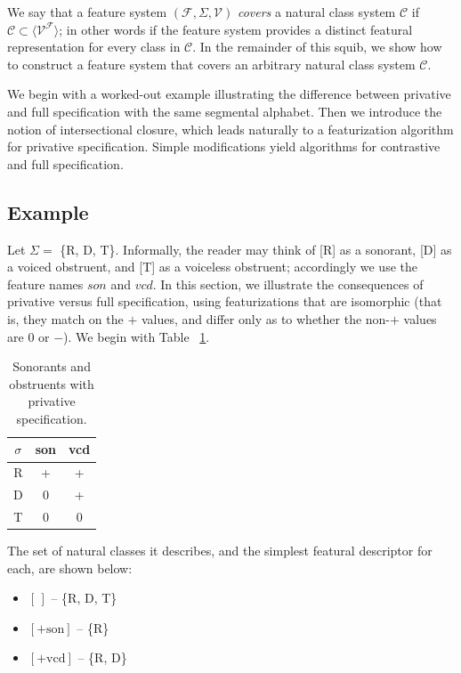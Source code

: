 \documentclass[11pt, oneside]{article}   	%
\begin{document}
\vspace{\baselineskip} We say that a feature system $(\mathcal F, \Sigma, \mathcal V)$ \textit{covers} a natural class system $\mathcal C$ if $\mathcal C \subset \langle \mathcal V^\mathcal F \rangle$; in other words if the feature system provides a distinct featural representation for every class in $\mathcal C$. In the remainder of this squib, we show how to construct a feature system that covers an arbitrary natural class system $\mathcal C$.

We begin with a worked-out example illustrating the difference between privative and full specification with the same segmental alphabet. Then we introduce the notion of intersectional closure, which leads naturally to a featurization algorithm for privative specification. Simple modifications yield algorithms for contrastive and full specification.

\subsection{Example}

Let $\Sigma =$ \{R, D, T\}. Informally, the reader may think of [R] as a sonorant, [D] as a voiced obstruent, and [T] as a voiceless obstruent; accordingly we use the feature names $son$ and $vcd$. In this section, we illustrate the consequences of privative versus full specification, using featurizations that are isomorphic (that is, they match on the $+$ values, and differ only as to whether the non-$+$ values are $0$ or $-$). We begin with Table ~\ref{table:privative}.

\begin{table}[h]
    \centering
    \begin{tabular} {|c||c|c|}
    \hline
        $\sigma$ & son & vcd \\ \hline
        R & + & + \\
        D & 0 & + \\
        T & 0 & 0 \\
        \hline
    \end{tabular}
    \caption{Sonorants and obstruents with privative specification.}
    \label{table:privative}
\end{table}

\noindent The set of natural classes it describes, and the simplest featural descriptor for each, are shown below: \begin{itemize}
  \item $[\,]$ -- \{R, D, T\}
  \item $[+\text{son}]$ -- \{R\}
  \item $[+\text{vcd}]$ -- \{R, D\}
  \end{itemize}
  
\end{document}
